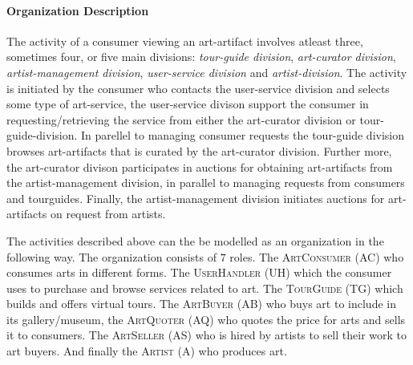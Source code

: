 \documentclass[paper=letter, fontsize=12pt]{article}
\begin{document}
\paragraph{Organization Description}
The activity of a consumer viewing an art-artifact involves atleast three, sometimes four, or five main divisions: \textit{tour-guide division}, \textit{art-curator division}, \textit{artist-management division}, \textit{user-service division} and \textit{artist-division}.
The activity is initiated by the  consumer who contacts the user-service division and selects some type of art-service, the user-service divison support the consumer in requesting/retrieving the service from either the art-curator division or tour-guide-division. In parellel to managing consumer requests the tour-guide division browses art-artifacts that is curated by the art-curator division. Further more, the art-curator divison participates in auctions for obtaining art-artifacts from the artist-management division, in parallel to managing requests from consumers and tourguides. Finally, the artist-management division initiates auctions for art-artifacts on request from artists.

The activities described above can the be modelled as an organization in the following way. The organization consists of $7$ roles. The \textsc{ArtConsumer (AC)} who consumes arts in different forms. The \textsc{UserHandler (UH)} which the consumer uses to purchase and browse services related to art. The \textsc{TourGuide (TG)} which builds and offers virtual tours. The \textsc{ArtBuyer (AB)} who buys art to include in its gallery/museum, the \textsc{ArtQuoter (AQ)} who quotes the price for arts and sells it to consumers. The \textsc{ArtSeller (AS)} who is hired by artists to sell their work to art buyers. And finally the \textsc{Artist (A)} who produces art.
\end{document}

